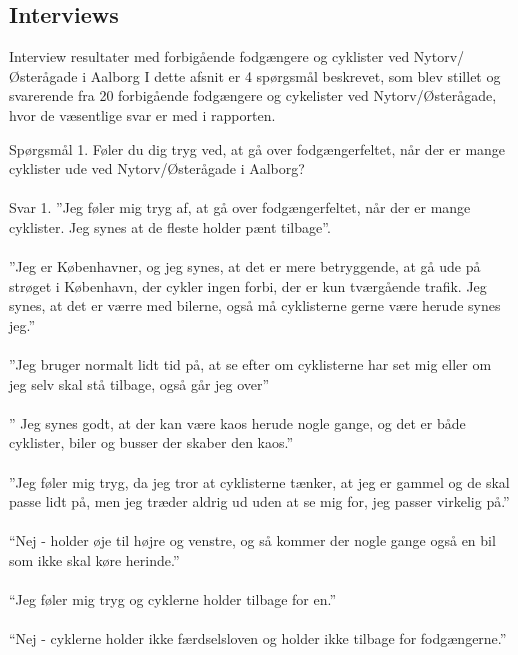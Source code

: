 \appendix
\label{appendix_start}


\begin{appendics}
  \chapter{Interviews}
  \label{chap:interviews}
Interview resultater med forbigående fodgængere og cyklister ved Nytorv/Østerågade i Aalborg I dette afsnit er 4 spørgsmål beskrevet, som blev stillet og svarerende fra 20 forbigående fodgængere og cykelister ved Nytorv/Østerågade, hvor de væsentlige svar er med i rapporten.

  Spørgsmål 1.
  Føler du dig tryg ved, at gå over fodgængerfeltet, når der er mange cyklister ude ved Nytorv/Østerågade i Aalborg?
\\\\
  Svar 1.
  ”Jeg føler mig tryg af, at gå over fodgængerfeltet, når der er mange cyklister. Jeg synes at de fleste holder pænt tilbage”.
\\\\
  ”Jeg er Københavner, og jeg synes, at det er mere betryggende, at gå ude på strøget i København, der cykler ingen forbi, der er kun tværgående trafik. Jeg synes, at det er værre med bilerne, også må cyklisterne gerne være herude synes jeg.”
\\\\
  ”Jeg bruger normalt lidt tid på, at se efter om cyklisterne har set mig eller om jeg selv skal stå tilbage, også går jeg over”
\\\\
  ” Jeg synes godt, at der kan være kaos herude nogle gange, og det er både cyklister, biler og busser der skaber den kaos.”
\\\\
  ”Jeg føler mig tryg, da jeg tror at cyklisterne tænker, at jeg er gammel og de skal passe lidt på, men jeg træder aldrig ud uden at se mig for, jeg passer virkelig på.”
\\\\
  “Nej - holder øje til højre og venstre, og så kommer der nogle gange også en bil som ikke skal køre herinde.”
\\\\
  “Jeg føler mig tryg og cyklerne holder tilbage for en.”
\\\\
  “Nej - cyklerne holder ikke færdselsloven og holder ikke tilbage for fodgængerne.”
\\\\

\end{appendics}
